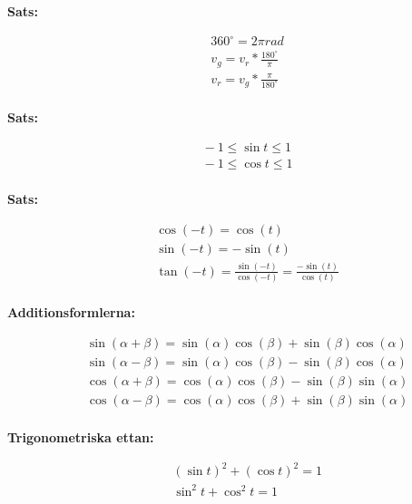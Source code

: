 \documentclass{article}
\begin{document}
\newpage

\textbf{Sats:}\par
\begin{align*}
  &\quad 360^\circ = 2\pi rad \\
  &\quad v_{g} = v_{r} * \frac{180^\circ}{\pi} \\
  &\quad v_{r} = v_{g} * \frac{\pi}{180^\circ} \\
\end{align*}

\textbf{Sats:}\par
\begin{align*}
  &\quad -1 \leq \sin{t} \leq 1 \\
  &\quad -1 \leq \cos{t} \leq 1 \\
\end{align*}

\textbf{Sats:}\par
\begin{align*}
  &\quad \cos{(-t)} = \cos{(t)} \\
  &\quad \sin{(-t)} = -\sin{(t)} \\
  &\quad \tan{(-t)} = \frac{\sin{(-t)}}{\cos{(-t)}} = \frac{-\sin{(t)}}{\cos{(t)}} \\
\end{align*}

\textbf{Additionsformlerna:}\par
\begin{align*}
  &\quad \sin{(\alpha + \beta)} = \sin{(\alpha)}\cos{(\beta)} + \sin{(\beta)}\cos{(\alpha)} \\
  &\quad \sin{(\alpha - \beta)} = \sin{(\alpha)}\cos{(\beta)} - \sin{(\beta)}\cos{(\alpha)} \\
  &\quad \cos{(\alpha + \beta)} = \cos{(\alpha)}\cos{(\beta)} - \sin{(\beta)}\sin{(\alpha)} \\
  &\quad \cos{(\alpha - \beta)} = \cos{(\alpha)}\cos{(\beta)} + \sin{(\beta)}\sin{(\alpha)} \\ 
\end{align*}

\textbf{Trigonometriska ettan:}\par
\begin{align*}
  &\quad (\sin{t})^{2} + (\cos{t})^{2} = 1 \\
  &\quad \sin^{2}{t} + \cos^{2}{t} = 1 \\ 
\end{align*}
\end{document}
